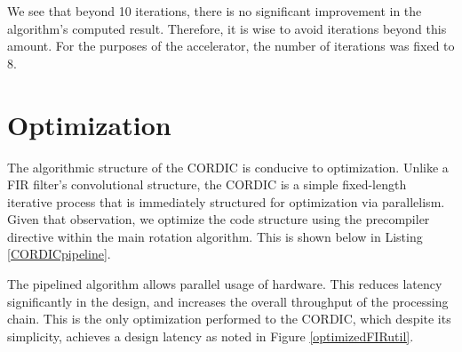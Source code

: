 \documentclass[../report_polarFIR.tex]{subfiles}
\begin{document}
We see that beyond 10 iterations, there is no significant improvement in the algorithm's computed result. Therefore, it is wise to avoid iterations beyond this amount. For the purposes of the accelerator, the number of iterations was fixed to 8.


\section{Optimization}

The algorithmic structure of the CORDIC is conducive to optimization. Unlike a FIR filter's convolutional structure, the CORDIC is a simple fixed-length iterative process that is immediately structured for optimization via parallelism.  Given that observation, we optimize the code structure using the precompiler directive  within the main rotation algorithm. This is shown below in Listing \ref{CORDICpipeline}.

		\begin{singlespace}
            
        \end{singlespace}


The pipelined algorithm allows parallel usage of hardware. This reduces latency significantly in the design, and increases the overall throughput of the processing chain. This is the only optimization performed to the CORDIC, which despite its simplicity, achieves a design latency as noted in Figure \ref{optimizedFIRutil}.
\end{document}
